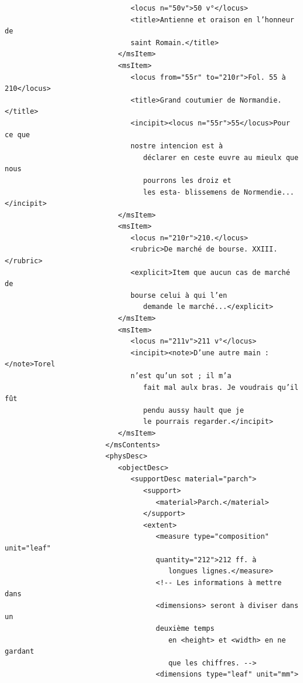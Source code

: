 \documentclass[a4paper,12pt,twoside]{book}
\begin{document}
\begin{verbatim}
                              <locus n="50v">50 v°</locus>
                              <title>Antienne et oraison en l’honneur de 
                              saint Romain.</title>
                           </msItem>
                           <msItem>
                              <locus from="55r" to="210r">Fol. 55 à 210</locus>
                              <title>Grand coutumier de Normandie.</title>
                              <incipit><locus n="55r">55</locus>Pour ce que 
                              nostre intencion est à
                                 déclarer en ceste euvre au mieulx que nous
                                 pourrons les droiz et
                                 les esta- blissemens de Normendie...</incipit>
                           </msItem>
                           <msItem>
                              <locus n="210r">210.</locus>
                              <rubric>De marché de bourse. XXIII.</rubric>
                              <explicit>Item que aucun cas de marché de
                              bourse celui à qui l’en
                                 demande le marché...</explicit>
                           </msItem>
                           <msItem>
                              <locus n="211v">211 v°</locus>
                              <incipit><note>D’une autre main :</note>Torel 
                              n’est qu’un sot ; il m’a
                                 fait mal aulx bras. Je voudrais qu’il fût
                                 pendu aussy hault que je
                                 le pourrais regarder.</incipit>
                           </msItem>
                        </msContents>
                        <physDesc>
                           <objectDesc>
                              <supportDesc material="parch">
                                 <support>
                                    <material>Parch.</material>
                                 </support>
                                 <extent>
                                    <measure type="composition" unit="leaf" 
                                    quantity="212">212 ff. à
                                       longues lignes.</measure>
                                    <!-- Les informations à mettre dans 
                                    <dimensions> seront à diviser dans un
                                    deuxième temps 
                                       en <height> et <width> en ne gardant 
                                       que les chiffres. -->
                                    <dimensions type="leaf" unit="mm">

\end{verbatim}
\end{document}
